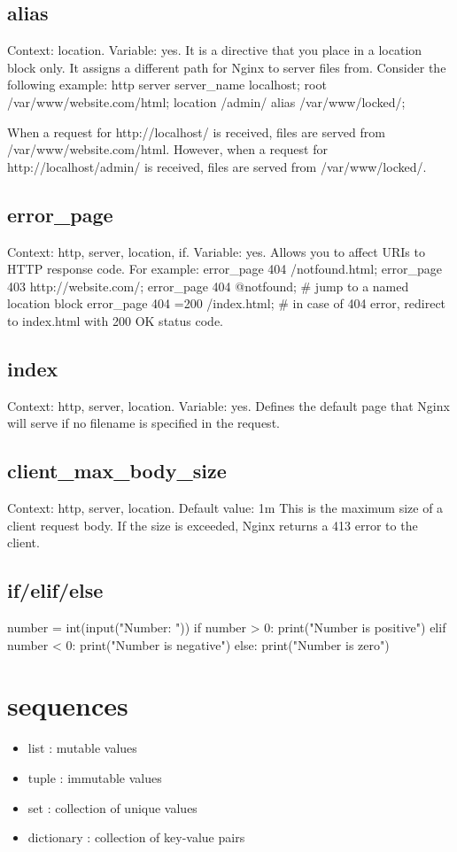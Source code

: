 \documentclass[12pt]{article}
\begin{document}
\subsection{alias}
Context: location. Variable: yes.
It is a directive that you place in a location block only. It assigns a different
path for Nginx to server files from. Consider the following example:
 http {
   server {
       server_name localhost;
       root /var/www/website.com/html;
        location /admin/ {
        alias /var/www/locked/;
      }
   }
 }

 When a request for http://localhost/ is received, files are served from
 /var/www/website.com/html. However, when a request for http://localhost/admin/
 is received, files are served from /var/www/locked/.

\subsection{error_page}
Context: http, server, location, if. Variable: yes.
Allows you to affect URIs to HTTP response code. For example:
error_page 404 /notfound.html;
error_page 403 http://website.com/;
error_page 404 @notfound; # jump to a named location block
error_page 404 =200 /index.html; # in case of 404 error, redirect to
index.html with 200 OK status code.

\subsection{index}
Context: http, server, location. Variable: yes.
Defines the default page that Nginx will serve if no filename is specified in
the request.

\subsection{client_max_body_size}
Context: http, server, location.
Default value: 1m
This is the maximum size of a client request body. If the size is exceeded,
Nginx returns a 413 error to the client.

\subsection{if/elif/else}
number = int(input("Number: "))
if number > 0:
    print("Number is positive")
elif number < 0:
    print("Number is negative")
else:
    print("Number is zero")

\section{sequences}
\begin{itemize}
    \item list : mutable values
    \item tuple : immutable values
    \item set : collection of unique values
    \item dictionary : collection of key-value pairs
\end{itemize}
\end{document}
